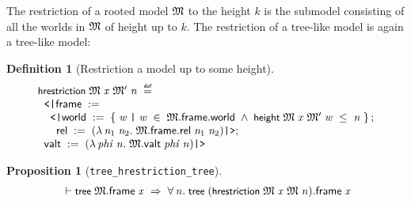 \documentclass[letterpaper]{article}
\newtheorem{defn}{Definition}
\newtheorem{prop}{Proposition}
\renewcommand{\HOLConst}[1]{{\textsf{\upshape\small #1}}}
\renewcommand{\HOLinline}[1]{\ensuremath{#1}}
\newenvironment{holmath}{\begin{displaymath}\begin{array}{l}}{\end{array}\end{displaymath}\ignorespacesafterend}
\begin{document}
The restriction of a rooted model \HOLinline{\HOLFreeVar{\ensuremath{\mathfrak{M}}}} to the height $k$ is the submodel consisting of all the worlds in \HOLinline{\HOLFreeVar{\ensuremath{\mathfrak{M}}}} of height up to $k$. The restriction of a tree-like model is again a tree-like model:
\begin{defn}[Restriction a model up to some height]
\begin{holmath}
  \HOLConst{hrestriction}\;\HOLFreeVar{\ensuremath{\mathfrak{M}}}\;\HOLFreeVar{x}\;\HOLFreeVar{\ensuremath{\mathfrak{M}'}}\;\HOLFreeVar{n}\;\HOLSymConst{\HOLTokenDefEquality{}}\\
\;\;\HOLTokenLeftrec{}\HOLFieldName{frame}\;:=\\
\;\;\;\;\HOLTokenLeftrec{}\HOLFieldName{world}\;:=\;\HOLTokenLeftbrace{}\HOLBoundVar{w}\;\HOLTokenBar{}\;\HOLBoundVar{w}\;\HOLSymConst{\HOLTokenIn{}}\;\HOLFreeVar{\ensuremath{\mathfrak{M}}}.\HOLFieldName{frame}.\HOLFieldName{world}\;\HOLSymConst{\HOLTokenConj{}}\;\HOLConst{height}\;\HOLFreeVar{\ensuremath{\mathfrak{M}}}\;\HOLFreeVar{x}\;\HOLFreeVar{\ensuremath{\mathfrak{M}'}}\;\HOLBoundVar{w}\;\HOLSymConst{\HOLTokenLeq{}}\;\HOLFreeVar{n}\HOLTokenRightbrace{};\\
\;\;\;\;\;\;\HOLFieldName{rel}\;:=\;(\HOLTokenLambda{}\HOLBoundVar{n\sb{\mathrm{1}}}\;\HOLBoundVar{n\sb{\mathrm{2}}}.\;\HOLFreeVar{\ensuremath{\mathfrak{M}}}.\HOLFieldName{frame}.\HOLFieldName{rel}\;\HOLBoundVar{n\sb{\mathrm{1}}}\;\HOLBoundVar{n\sb{\mathrm{2}}})\HOLTokenRightrec{};\\
\;\;\HOLFieldName{valt}\;:=\;(\HOLTokenLambda{}\HOLBoundVar{phi}\;\HOLBoundVar{n}.\;\HOLFreeVar{\ensuremath{\mathfrak{M}}}.\HOLFieldName{valt}\;\HOLBoundVar{phi}\;\HOLBoundVar{n})\HOLTokenRightrec{}
\end{holmath}
\end{defn}

\begin{prop}[\texttt{tree_hrestriction_tree}]
\begin{holmath}
  \ensuremath{\HOLTokenTurnstile}\HOLConst{tree}\;\HOLFreeVar{\ensuremath{\mathfrak{M}}}.\HOLFieldName{frame}\;\HOLFreeVar{x}\;\HOLSymConst{\HOLTokenImp{}}\;\HOLSymConst{\HOLTokenForall{}}\HOLBoundVar{n}.\;\HOLConst{tree}\;(\HOLConst{hrestriction}\;\HOLFreeVar{\ensuremath{\mathfrak{M}}}\;\HOLFreeVar{x}\;\HOLFreeVar{\ensuremath{\mathfrak{M}}}\;\HOLBoundVar{n}).\HOLFieldName{frame}\;\HOLFreeVar{x}
\end{holmath}
\end{prop}
\end{document}
